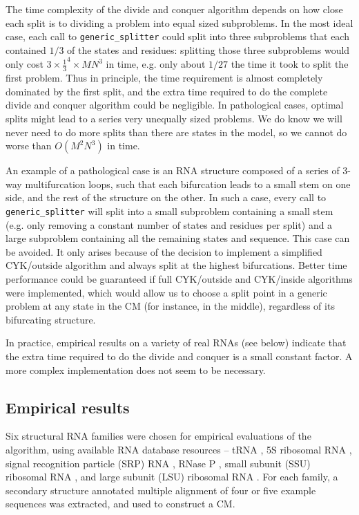 \documentclass[11pt]{article}
\begin{document}
The time complexity of the divide and conquer algorithm depends on how
close each split is to dividing a problem into equal sized
subproblems. In the most ideal case, each call to
\texttt{generic\_splitter} could split into three subproblems that
each contained $1/3$ of the states and residues: splitting those three
subproblems would only cost $3 \times \frac{1}{3}^4 \times MN^3$ in
time, e.g. only about $1/27$ the time it took to split the first
problem. Thus in principle, the time requirement is almost completely
dominated by the first split, and the extra time required to do the
complete divide and conquer algorithm could be negligible. In
pathological cases, optimal splits might lead to a series very
unequally sized problems. We do know we will never need to do more
splits than there are states in the model, so we cannot do worse than
$O(M^2N^3)$ in time.

An example of a pathological case is an RNA structure composed of a
series of 3-way multifurcation loops, such that each bifurcation leads
to a small stem on one side, and the rest of the structure on the
other. In such a case, every call to \texttt{generic\_splitter} will
split into a small subproblem containing a small stem (e.g. only
removing a constant number of states and residues per split) and a
large subproblem containing all the remaining states and sequence.
This case can be avoided. It only arises because of the decision to
implement a simplified CYK/outside algorithm and always split at the
highest bifurcations. Better time performance could be guaranteed if
full CYK/outside and CYK/inside algorithms were implemented, which
would allow us to choose a split point in a generic problem at any
state in the CM (for instance, in the middle), regardless of its
bifurcating structure.

In practice, empirical results on a variety of real RNAs (see below)
indicate that the extra time required to do the divide and conquer is
a small constant factor. A more complex implementation does not seem
to be necessary.

\subsection{Empirical results}

Six structural RNA families were chosen for empirical evaluations of
the algorithm, using available RNA database resources -- tRNA
\cite{Steinberg93}, 5S ribosomal RNA \cite{Szymanski02}, signal
recognition particle (SRP) RNA \cite{Larsen91}, RNase P
\cite{Brown99}, small subunit (SSU) ribosomal RNA \cite{Neefs93}, and
large subunit (LSU) ribosomal RNA \cite{deRijk94}. For each family, a
secondary structure annotated multiple alignment of four or five
example sequences was extracted, and used to construct a CM. 
\end{document}
